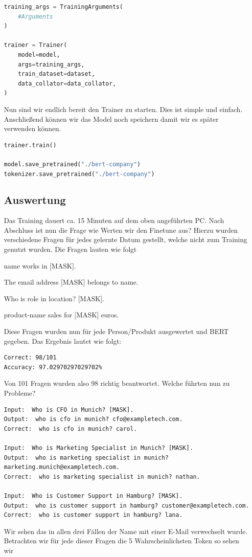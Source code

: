 \documentclass[a4paper, 11pt]{article}          %
\begin{document}
\begin{lstlisting}[language = python]
training_args = TrainingArguments(
    #Arguments
)

trainer = Trainer(
    model=model,
    args=training_args,
    train_dataset=dataset,
    data_collator=data_collator,
)
\end{lstlisting}
Nun sind wir endlich bereit den Trainer zu starten. Dies ist simple und einfach. Anschließend können wir das Model noch speichern damit wir es später verwenden können. 
\begin{lstlisting}[language = python]
trainer.train()

model.save_pretrained("./bert-company")
tokenizer.save_pretrained("./bert-company")
\end{lstlisting}

\subsection{Auswertung}
Das Training dauert ca. 15 Minuten auf dem oben angeführten PC. Nach Abschluss ist nun die Frage wie Werten wir den Finetune aus? Hierzu wurden verschiedene Fragen für jedes gelernte Datum gestellt, welche nicht zum Training genutzt wurden. Die Fragen lauten wie folgt
\begin{center}
    {name} works in [MASK].
\end{center}
\begin{center}
    The email address [MASK] belongs to {name}.
\end{center}
\begin{center}
    Who is {role} in {location}? [MASK].
\end{center}
\begin{center}
    {product-name} sales for [MASK] euros.
\end{center}
Diese Fragen wurden nun für jede Person/Produkt ausgewertet und BERT gegeben. Das Ergebnis lautet wie folgt:
\begin{verbatim}
Correct: 98/101
Accuracy: 97.02970297029702%
\end{verbatim}
Von 101 Fragen wurden also 98 richtig beantwortet. Welche führten nun zu Probleme?
\begin{verbatim}
Input:  Who is CFO in Munich? [MASK].
Output:  who is cfo in munich? cfo@exampletech.com.
Correct:  who is cfo in munich? carol.

Input:  Who is Marketing Specialist in Munich? [MASK].
Output:  who is marketing specialist in munich? marketing.munich@exampletech.com.
Correct:  who is marketing specialist in munich? nathan.

Input:  Who is Customer Support in Hamburg? [MASK].
Output:  who is customer support in hamburg? customer@exampletech.com.
Correct:  who is customer support in hamburg? lana.
\end{verbatim}
Wir sehen das in allen drei Fällen der Name mit einer E-Mail verwechselt wurde. Betrachten wir für jede dieser Fragen die 5 Wahrscheinlichsten Token so sehen wir 
\end{document}
